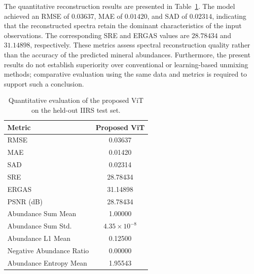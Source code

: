 \documentclass[runningheads]{llncs}
\begin{document}
The quantitative reconstruction results are presented in
Table~\ref{tab:quant_results}. The model achieved an RMSE of
$0.03637$, MAE of $0.01420$, and SAD of $0.02314$, indicating that the
reconstructed spectra retain the dominant characteristics of the input
observations. The corresponding SRE and ERGAS values are $28.78434$
and $31.14898$, respectively. These metrics assess spectral
reconstruction quality rather than the accuracy of the predicted
mineral abundances. Furthermore, the present results do not establish
superiority over conventional or learning-based unmixing methods;
comparative evaluation using the same data and metrics is required
to support such a conclusion.

\begin{table}[t]
    \centering
    \caption{Quantitative evaluation of the proposed ViT on the
    held-out IIRS test set.}
    \label{tab:quant_results}
    \footnotesize
    \setlength{\tabcolsep}{5pt}
    \renewcommand{\arraystretch}{1.10}
    \begin{tabular}{lc}
        \toprule
        \textbf{Metric} & \textbf{Proposed ViT} \\
        \midrule
        RMSE & 0.03637 \\
        MAE & 0.01420 \\
        SAD & 0.02314 \\
        SRE & 28.78434 \\
        ERGAS & 31.14898 \\
        PSNR (dB) & 28.78434 \\
        Abundance Sum Mean & 1.00000 \\
        Abundance Sum Std. & $4.35\times10^{-8}$ \\
        Abundance L1 Mean & 0.12500 \\
        Negative Abundance Ratio & 0.00000 \\
        Abundance Entropy Mean & 1.95543 \\
        \bottomrule
    \end{tabular}
\end{table}
\end{document}
